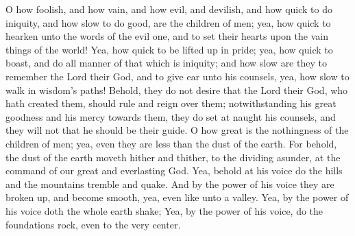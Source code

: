 O how foolish, and how vain, and how evil, and devilish, and how quick to do iniquity, and how slow to do good, are the children of men; yea, how quick to hearken unto the words of the evil one, and to set their hearts upon the vain things of the world!
\bverse \iffalse Yea, how quick to be lifted up in pride; yea, how quick to boast, and do all manner of that which is iniquity; and how slow are they to remember the Lord their God, and to give ear unto his counsels, yea, how slow to walk in wisdom's paths! \fi
Yea, how quick to be lifted up in pride; yea, how quick to boast, and do all manner of that which is iniquity; and how slow are they to remember the Lord their God, and to give ear unto his counsels, yea, how slow to walk in wisdom's paths!
\bverse \iffalse Behold, they do not desire that the Lord their God, who hath created them, should rule and reign over them; notwithstanding his great goodness and his mercy towards them, they do set at naught his counsels, and they will not that he should be their guide. \fi
Behold, they do not desire that the Lord their God, who hath created them, should rule and reign over them; notwithstanding his great goodness and his mercy towards them, they do set at naught his counsels, and they will not that he should be their guide.
\bverse \iffalse O how great is the nothingness of the children of men; yea, even they are less than the dust of the earth. \fi
O how great is the nothingness of the children of men; yea, even they are less than the dust of the earth.
\bverse \iffalse For behold, the dust of the earth moveth hither and thither, to the dividing asunder, at the command of our great and everlasting God. \fi
For behold, the dust of the earth moveth hither and thither, to the dividing asunder, at the command of our great and everlasting God.
\bverse \iffalse Yea, behold at his voice do the hills and the mountains tremble and quake. \fi
Yea, behold at his voice do the hills and the mountains tremble and quake.
\bverse \iffalse And by the power of his voice they are broken up, and become smooth, yea, even like unto a valley. \fi
And by the power of his voice they are broken up, and become smooth, yea, even like unto a valley.
\bverse \iffalse Yea, by the power of his voice doth the whole earth shake; \fi
Yea, by the power of his voice doth the whole earth shake;
\bverse \iffalse Yea, by the power of his voice, do the foundations rock, even to the very center. \fi
Yea, by the power of his voice, do the foundations rock, even to the very center.
